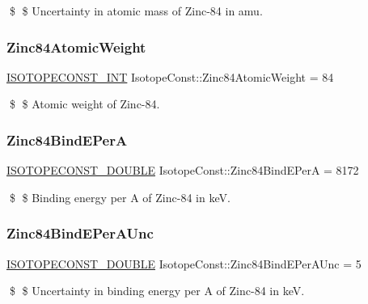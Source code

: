 \$ \$ Uncertainty in atomic mass of Zinc-\/84 in amu. \mbox{\label{group___isotope_const-_zinc-_zn84_ga50ba764f7441e19d9167345bc33c5694}} 
\subsubsection{\texorpdfstring{Zinc84\+Atomic\+Weight}{Zinc84AtomicWeight}}
{\footnotesize\ttfamily \mbox{\hyperlink{group___isotope_const-_macros_ga5f18360b3e99483a35c32d789e62621c}{I\+S\+O\+T\+O\+P\+E\+C\+O\+N\+S\+T\+\_\+\+I\+NT}} Isotope\+Const\+::\+Zinc84\+Atomic\+Weight = 84}

\$ \$ Atomic weight of Zinc-\/84. \mbox{\label{group___isotope_const-_zinc-_zn84_gaa2ee9a73d569aa0629b85d0aa25da0e7}} 
\subsubsection{\texorpdfstring{Zinc84\+Bind\+E\+PerA}{Zinc84BindEPerA}}
{\footnotesize\ttfamily \mbox{\hyperlink{group___isotope_const-_macros_ga8f45a7272ce02c0b4c65c44636ed719a}{I\+S\+O\+T\+O\+P\+E\+C\+O\+N\+S\+T\+\_\+\+D\+O\+U\+B\+LE}} Isotope\+Const\+::\+Zinc84\+Bind\+E\+PerA = 8172}

\$ \$ Binding energy per A of Zinc-\/84 in keV. \mbox{\label{group___isotope_const-_zinc-_zn84_gadef99e19e1e53b66372ccf7ea3d5a0bf}} 
\subsubsection{\texorpdfstring{Zinc84\+Bind\+E\+Per\+A\+Unc}{Zinc84BindEPerAUnc}}
{\footnotesize\ttfamily \mbox{\hyperlink{group___isotope_const-_macros_ga8f45a7272ce02c0b4c65c44636ed719a}{I\+S\+O\+T\+O\+P\+E\+C\+O\+N\+S\+T\+\_\+\+D\+O\+U\+B\+LE}} Isotope\+Const\+::\+Zinc84\+Bind\+E\+Per\+A\+Unc = 5}

\$ \$ Uncertainty in binding energy per A of Zinc-\/84 in keV. \mbox{\label{group___isotope_const-_zinc-_zn84_ga0dad5a37765b7dc679f9237e65b94316}} 
